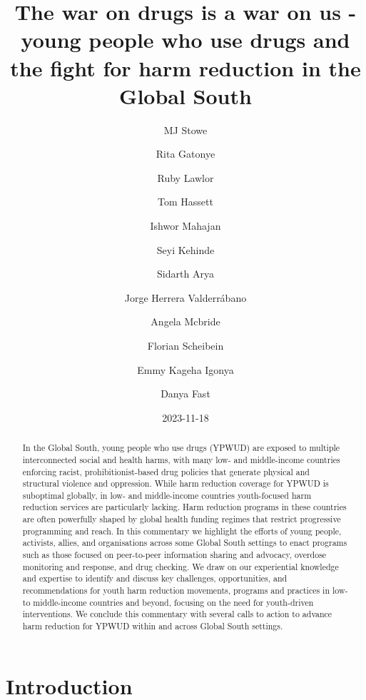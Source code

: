 \documentclass[
  letterpaper,
  DIV=11,
  numbers=noendperiod]{scrartcl}
\title{The war on drugs is a war on us - young people who use drugs and
the fight for harm reduction in the Global South}
\author{MJ Stowe \and Rita Gatonye \and Ruby Lawlor \and Tom
Hassett \and Ishwor Mahajan \and Seyi Kehinde \and Sidarth
Arya \and Jorge Herrera Valderrábano \and Angela Mcbride \and Florian
Scheibein \and Emmy Kageha Igonya \and Danya Fast}
\date{2023-11-18}
\begin{document}
\maketitle
\begin{abstract}
In the Global South, young people who use drugs (YPWUD) are exposed to
multiple interconnected social and health harms, with many low- and
middle-income countries enforcing racist, prohibitionist-based drug
policies that generate physical and structural violence and oppression.
While harm reduction coverage for YPWUD is suboptimal globally, in low-
and middle-income countries youth-focused harm reduction services are
particularly lacking. Harm reduction programs in these countries are
often powerfully shaped by global health funding regimes that restrict
progressive programming and reach. In this commentary we highlight the
efforts of young people, activists, allies, and organisations across
some Global South settings to enact programs such as those focused on
peer-to-peer information sharing and advocacy, overdose monitoring and
response, and drug checking. We draw on our experiential knowledge and
expertise to identify and discuss key challenges, opportunities, and
recommendations for youth harm reduction movements, programs and
practices in low- to middle-income countries and beyond, focusing on the
need for youth-driven interventions. We conclude this commentary with
several calls to action to advance harm reduction for YPWUD within and
across Global South settings.
\end{abstract}
\section{Introduction}\label{introduction}
\end{document}
